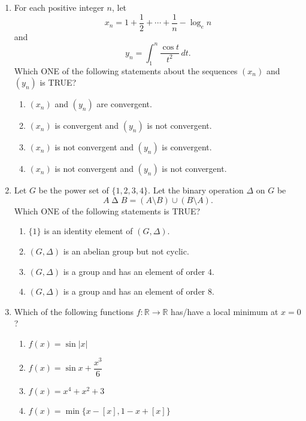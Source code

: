 \begin{enumerate}
\begin{enumerate}[label=(\Alph*)]
\[\operatorname{vect}(F(P),F(Q))\cdot\operatorname{vect}(F(R),F(S))=\operatorname{vect}(P,Q)\cdot\operatorname{vect}(R,S),\]
where $\cdot$ denotes the usual dot product in $\mathbb R^3$.
\item For any four points $P,Q,R,S$ in $\mathbb R^3$, we have
\[\operatorname{vect}(F(P),F(Q))\times\operatorname{vect}(F(R),F(S))=\operatorname{vect}(P,Q)\times\operatorname{vect}(R,S),\]
where $\times$ denotes the usual cross product in $\mathbb R^3$.
\end{enumerate}
\item For each positive integer $n$, let
\[x_n=1+\frac12+\cdots+\frac1n-\log_e n\]
and
\[y_n=\int_1^n\frac{\cos t}{t^2}\,dt.\]
Which ONE of the following statements about the sequences $(x_n)$ and $(y_n)$ is TRUE?
\begin{enumerate}[label=(\Alph*)]
\item $(x_n)$ and $(y_n)$ are convergent.
\item $(x_n)$ is convergent and $(y_n)$ is not convergent.
\item $(x_n)$ is not convergent and $(y_n)$ is convergent.
\item $(x_n)$ is not convergent and $(y_n)$ is not convergent.
\end{enumerate}
\item Let $G$ be the power set of $\{1,2,3,4\}$. Let the binary operation $\Delta$ on $G$ be
\[A\mathbin{\Delta} B=(A\setminus B)\cup(B\setminus A).\]
Which ONE of the following statements is TRUE?
\begin{enumerate}[label=(\Alph*)]
\item $\{1\}$ is an identity element of $(G,\Delta)$.
\item $(G,\Delta)$ is an abelian group but not cyclic.
\item $(G,\Delta)$ is a group and has an element of order $4$.
\item $(G,\Delta)$ is a group and has an element of order $8$.
\end{enumerate}
\item Which of the following functions $f:\mathbb R\to\mathbb R$ has/have a local minimum at $x=0$?
\begin{enumerate}[label=(\Alph*)]
\item $f(x)=\sin|x|$
\item $f(x)=\sin x+\dfrac{x^3}{6}$
\item $f(x)=x^4+x^2+3$
\item $f(x)=\min\{x-[x],1-x+[x]\}$
\end{enumerate}

\end{enumerate}
